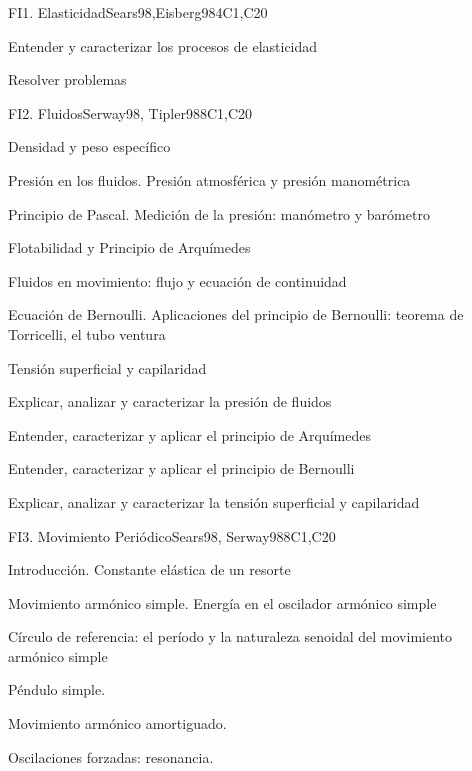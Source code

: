 \begin{syllabus}
\begin{unit}{FI1. Elasticidad}{}{Sears98,Eisberg98}{4}{C1,C20}
   \begin{learningoutcomes}
         \item  Entender y caracterizar los procesos de elasticidad
         \item  Resolver problemas
   \end{learningoutcomes}
\end{unit}

\begin{unit}{FI2. Fluidos}{Serway98, Tipler98}{}{8}{C1,C20}
\begin{topics}
         \item  Densidad y peso específico
	 \item  Presión en los fluidos. Presión atmosférica y presión manométrica
         \item  Principio de Pascal. Medición de la presión: manómetro y barómetro
	 \item  Flotabilidad y Principio de Arquímedes
         \item  Fluidos en movimiento: flujo y ecuación de continuidad
	 \item  Ecuación de Bernoulli. Aplicaciones del principio de Bernoulli: teorema de Torricelli, el tubo ventura
         \item  Tensión superficial y capilaridad
   \end{topics}

   \begin{learningoutcomes}
         \item  Explicar, analizar y caracterizar la presión de fluidos
         \item  Entender, caracterizar y aplicar el principio de Arquímedes
         \item  Entender, caracterizar y aplicar el principio de Bernoulli
         \item  Explicar, analizar y caracterizar la tensión superficial y capilaridad
   \end{learningoutcomes}
\end{unit}

\begin{unit}{FI3. Movimiento Periódico}{Sears98, Serway98}{}{8}{C1,C20}
\begin{topics}
         \item  Introducción. Constante elástica de un resorte
	 \item  Movimiento armónico simple. Energía en el oscilador armónico simple
         \item  Círculo de referencia: el período y la naturaleza senoidal del movimiento armónico simple
	 \item  Péndulo simple.
         \item  Movimiento armónico amortiguado.
         \item  Oscilaciones forzadas: resonancia.
   \end{topics}


\end{unit}
\end{syllabus}
